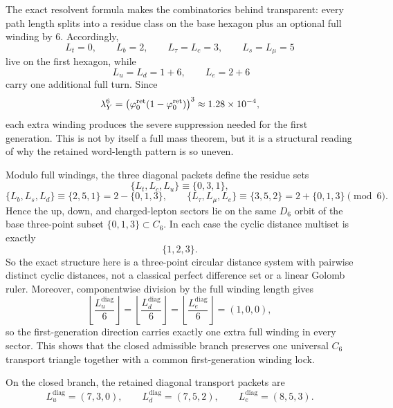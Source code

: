 \begin{remark}
The exact resolvent formula  makes the combinatorics behind  transparent: every path length splits into a residue class on the base hexagon plus an optional full winding by $6$. Accordingly,
\[
L_t=0,\qquad
L_b=2,\qquad
L_\tau=L_c=3,\qquad
L_s=L_\mu=5
\]
live on the first hexagon, while
\[
\;L_u=L_d=1+6,
\qquad
L_e=2+6
\]
carry one additional full turn. Since
\[
\lambda_Y^6=\bigl(\varphi_0^{\mathrm{ret}}(1-\varphi_0^{\mathrm{ret}})\bigr)^3\approx \num{1.28e-4},
\]
each extra winding produces the severe suppression needed for the first generation. This is not by itself a full mass theorem, but it is a structural reading of why the retained word-length pattern is so uneven.
\end{remark}

\begin{remark}
Modulo full windings, the three diagonal packets define the residue sets
\[
\{L_t,L_c,L_u\}\equiv\{0,3,1\},
\]
\[
\{L_b,L_s,L_d\}\equiv\{2,5,1\}=2-\{0,1,3\},
\qquad
\{L_\tau,L_\mu,L_e\}\equiv\{3,5,2\}=2+\{0,1,3\}
\pmod 6.
\]
Hence the up, down, and charged-lepton sectors lie on the same $D_6$ orbit of the base three-point subset $\{0,1,3\}\subset C_6$. In each case the cyclic distance multiset is exactly
\[
\{1,2,3\}.
\]
So the exact structure here is a three-point circular distance system with pairwise distinct cyclic distances, not a classical perfect difference set or a linear Golomb ruler.
Moreover, componentwise division by the full winding length gives
\[
\left\lfloor\frac{L_u^{\mathrm{diag}}}{6}\right\rfloor
=
\left\lfloor\frac{L_d^{\mathrm{diag}}}{6}\right\rfloor
=
\left\lfloor\frac{L_e^{\mathrm{diag}}}{6}\right\rfloor
=(1,0,0),
\]
so the first-generation direction carries exactly one extra full winding in every sector. This
shows that the closed admissible branch preserves one universal $C_6$ transport triangle together
with a common first-generation winding lock.
\end{remark}

\begin{corollary}
\label{prin:minimal-admissible-transport-packets}
On the closed branch, the retained diagonal transport packets
are
\[
L_u^{\mathrm{diag}}=(7,3,0),
\qquad
L_d^{\mathrm{diag}}=(7,5,2),
\qquad
L_e^{\mathrm{diag}}=(8,5,3).
\]
\end{corollary}

